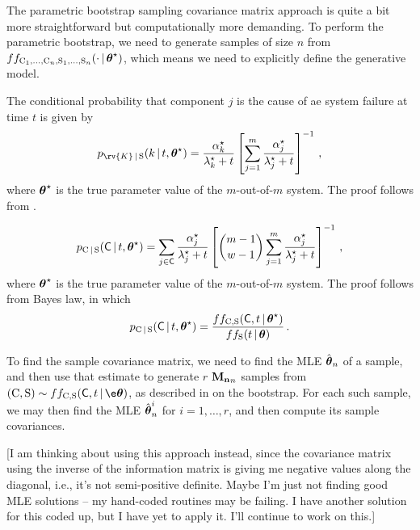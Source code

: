 \documentclass[
    11pt,
    extrafontsizes,
    article,
    oldfontcommands,
    final,
    oneside,
    openany,
    hidelinks]{memoir}
\begin{document}
The parametric bootstrap sampling covariance matrix approach is quite a bit more straightforward but computationally more demanding. To perform the parametric bootstrap, we need to generate samples of size $n$ from $f{f_{\mathrm{C}_1, \ldots, \mathrm{C}_n, \mathrm{S}_1, \ldots, \mathrm{S}_n}}(\cdot {\,|\,} {\boldsymbol{\mathbf{\theta}}}^{\star})$, which means we need to explicitly define the generative model.

The conditional probability that component $j$ is the cause of ae system failure at time $t$ is given by
\begin{equation}
\label{eq:pareto_cond_prob}
    \pmf_{\rv{K} \given \sv}(k \given t, \tparam{\vec\theta}) =
    \frac{ \tparam{\alpha}_k }{ \tparam{\lambda}_k + t }
    \left [
        \sum_{j=1}^{m} \frac{ \tparam{\alpha}_j }{ \tparam{\lambda}_j + t }
    \right ]^{-1}
    \,,
\end{equation}
where ${\boldsymbol{\mathbf{\theta}}}^{\star}$ is the true parameter value of the $m$-out-of-$m$ system. The proof follows from .

\begin{equation}
\label{eq:pareto_cond_cand_prob}
    \pmf_{\rvcand \given \sv}(\cand \given t, \tparam{\vec\theta}) =
    \sum_{j \in \cand} \frac{ \tparam{\alpha}_j }{ \tparam{\lambda}_j + t }
    \left [
        {{m-1} \choose {w-1}}
        \sum_{j=1}^{m} \frac{ \tparam{\alpha}_j }{ \tparam{\lambda}_j + t }
    \right ]^{-1}
    \,,
\end{equation}
where ${\boldsymbol{\mathbf{\theta}}}^{\star}$ is the true parameter value of the $m$-out-of-$m$ system.
The proof follows from Bayes law, in which
\begin{equation}
    \pmf_{\rvcand \given \sv}(\cand \given t, \tparam{\vec\theta}) =
    \frac{\pdf{f_{\rvcand, \sv}}(\cand, t \given \tparam{\vec\theta})}
    { \pdf{f_{\sv}}(t \given \vec\theta)}\,.
\end{equation}

To find the sample covariance matrix, we need to find the MLE $\hat{\boldsymbol{\mathbf{\theta}}}_n$ of a sample, and then use that estimate to generate $r$ $\boldsymbol{\mathbf{M_n}}_n$ samples from $(\rvcand, \sv) \sim \pdf{f_{\rvcand, \sv}}(\cand, t \given \e\vec\theta)$, as described in  on the bootstrap. For each such sample, we may then find the MLE $\hat{\boldsymbol{\mathbf{\theta}}}_n^{i}$ for $i=1,\ldots,r$, and then compute its sample covariances.

[I am thinking about using this approach instead, since the covariance matrix using the inverse of the information matrix is giving me negative values along the diagonal, i.e., it's not semi-positive definite. Maybe I'm just not finding good MLE solutions -- my hand-coded routines may be failing. I have another solution for this coded up, but I have yet to apply it. I'll continue to work on this.]
\end{document}
